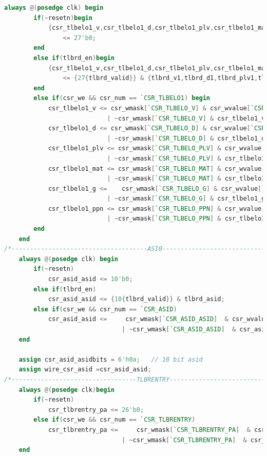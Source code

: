 \documentclass[11pt]{article}
\begin{document}
\begin{enumerate}
\begin{lstlisting}[language=verilog]
    always @(posedge clk) begin
        if(~resetn)begin
            {csr_tlbelo1_v,csr_tlbelo1_d,csr_tlbelo1_plv,csr_tlbelo1_mat,csr_tlbelo1_g,csr_tlbelo1_ppn} 
                <= 27'b0;
        end
        else if(tlbrd_en)begin
            {csr_tlbelo1_v,csr_tlbelo1_d,csr_tlbelo1_plv,csr_tlbelo1_mat,csr_tlbelo1_g,csr_tlbelo1_ppn} 
                <= {27{tlbrd_valid}} & {tlbrd_v1,tlbrd_d1,tlbrd_plv1,tlbrd_mat1,tlbrd_g,tlbrd_ppn1}; 
        end
        else if(csr_we && csr_num == `CSR_TLBELO1) begin
            csr_tlbelo1_v <= csr_wmask[`CSR_TLBELO_V] & csr_wvalue[`CSR_TLBELO_V]
                            | ~csr_wmask[`CSR_TLBELO_V] & csr_tlbelo1_v;
            csr_tlbelo1_d <= csr_wmask[`CSR_TLBELO_D] & csr_wvalue[`CSR_TLBELO_D]
                            | ~csr_wmask[`CSR_TLBELO_D] & csr_tlbelo1_d;
            csr_tlbelo1_plv <= csr_wmask[`CSR_TLBELO_PLV] & csr_wvalue[`CSR_TLBELO_PLV]
                            | ~csr_wmask[`CSR_TLBELO_PLV] & csr_tlbelo1_plv;
            csr_tlbelo1_mat <= csr_wmask[`CSR_TLBELO_MAT] & csr_wvalue[`CSR_TLBELO_MAT]
                            | ~csr_wmask[`CSR_TLBELO_MAT] & csr_tlbelo1_mat;
            csr_tlbelo1_g <=    csr_wmask[`CSR_TLBELO_G] & csr_wvalue[`CSR_TLBELO_G]
                            | ~csr_wmask[`CSR_TLBELO_G] & csr_tlbelo1_g;
            csr_tlbelo1_ppn <= csr_wmask[`CSR_TLBELO_PPN] & csr_wvalue[`CSR_TLBELO_PPN]
                            | ~csr_wmask[`CSR_TLBELO_PPN] & csr_tlbelo1_ppn;
        end
    end
/*-------------------------------------ASI0-----------------------------------------------*/
    always @(posedge clk) begin
        if(~resetn)
            csr_asid_asid <= 10'b0;
        else if(tlbrd_en)
            csr_asid_asid <= {10{tlbrd_valid}} & tlbrd_asid;
        else if(csr_we && csr_num == `CSR_ASID)
            csr_asid_asid <=     csr_wmask[`CSR_ASID_ASID]  & csr_wvalue[`CSR_ASID_ASID]
                                | ~csr_wmask[`CSR_ASID_ASID]  & csr_asid_asid;  
    end

    assign csr_asid_asidbits = 6'h0a;   // 10 bit asid
    assign wire_csr_asid =csr_asid_asid;
/*----------------------------------TLBRENTRY-----------------------------------------------*/
    always @(posedge clk)begin
        if(~resetn)
            csr_tlbrentry_pa <= 26'b0;
        else if(csr_we && csr_num == `CSR_TLBRENTRY)
            csr_tlbrentry_pa <=     csr_wmask[`CSR_TLBRENTRY_PA]  & csr_wvalue[`CSR_TLBRENTRY_PA]
                                | ~csr_wmask[`CSR_TLBRENTRY_PA]  & csr_tlbrentry_pa; 
    end


\end{lstlisting}
\end{enumerate}
\end{document}
